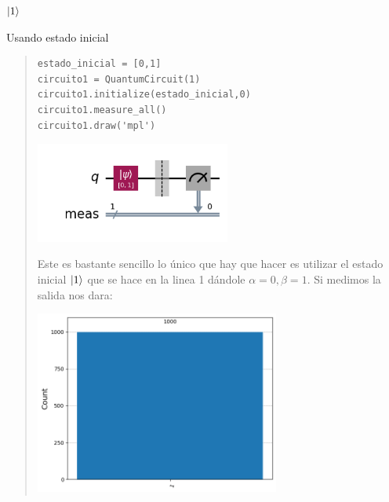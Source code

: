 \textbf{$\ket{1}$}\vspace{.2cm}

\textcolor{bibi}{Usando estado inicial}\vspace{.2cm}

\begin{quote}
    \begin{verbatim}
estado_inicial = [0,1]
circuito1 = QuantumCircuit(1)
circuito1.initialize(estado_inicial,0)
circuito1.measure_all()
circuito1.draw('mpl')
    \end{verbatim}
    \vspace{.3cm}
    \begin{center}
        \includegraphics[height=3.3cm]{src/Img/1.1.png}
    \end{center}

    Este es bastante sencillo lo único que hay que hacer es utilizar el estado inicial
    $\ket{1}$ que se hace en la linea 1 dándole $\alpha=0, \beta=1$. Si medimos la salida nos
    dara: 
    \vspace{.5cm}

    \begin{center}
        \includegraphics[height=6cm]{src/Img/1.1.r.png}
    \end{center}
\end{quote}
\newpage
